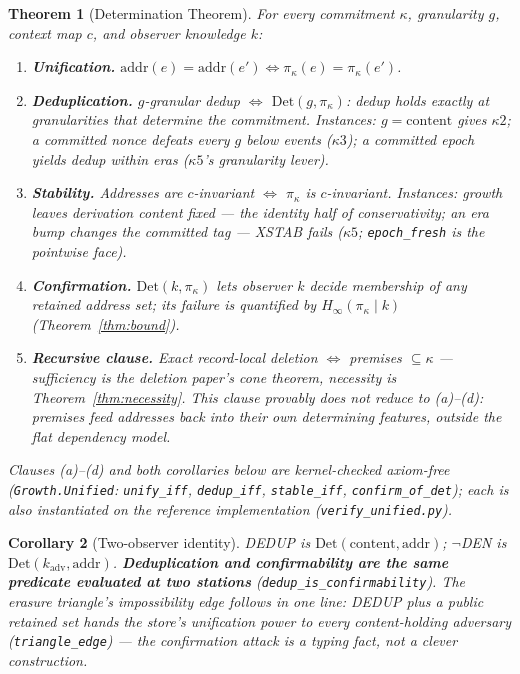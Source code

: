 \documentclass[10pt]{article}
\newtheorem{theorem}{Theorem}
\newtheorem{corollary}[theorem]{Corollary}
\newcommand{\sub}{\subseteq}
\begin{document}
\begin{theorem}[Determination Theorem]\label{thm:determination}
For every commitment $\kappa$, granularity $g$, context map $c$, and observer knowledge $k$:
\begin{enumerate}[label=(\alph*), itemsep=1pt, leftmargin=2em]
\item \textbf{Unification.} $\mathrm{addr}(e) = \mathrm{addr}(e') \iff \pi_\kappa(e) = \pi_\kappa(e')$.
\item \textbf{Deduplication.} $g$-granular dedup $\iff$ $\mathrm{Det}(g, \pi_\kappa)$: dedup holds exactly at granularities that determine the commitment. Instances: $g = \text{content}$ gives $\kappa2$; a committed nonce defeats every $g$ below events ($\kappa3$); a committed epoch yields dedup within eras ($\kappa5$'s granularity lever).
\item \textbf{Stability.} Addresses are $c$-invariant $\iff$ $\pi_\kappa$ is $c$-invariant. Instances: growth leaves derivation content fixed --- the identity half of conservativity; an era bump changes the committed tag --- XSTAB fails ($\kappa5$; \texttt{epoch\_fresh} is the pointwise face).
\item \textbf{Confirmation.} $\mathrm{Det}(k, \pi_\kappa)$ lets observer $k$ decide membership of any retained address set; its failure is quantified by $H_\infty(\pi_\kappa \mid k)$ (Theorem~\ref{thm:bound}).
\item \textbf{Recursive clause.} Exact record-local deletion $\iff$ premises $\sub \kappa$ --- sufficiency is the deletion paper's cone theorem, necessity is Theorem~\ref{thm:necessity}. This clause provably does \emph{not} reduce to (a)--(d): premises feed addresses back into their own determining features, outside the flat dependency model.
\end{enumerate}
Clauses (a)--(d) and both corollaries below are kernel-checked \emph{axiom-free} (\texttt{Growth.Unified}: \texttt{unify\_iff}, \texttt{dedup\_iff}, \texttt{stable\_iff}, \texttt{confirm\_of\_det}); each is also instantiated on the reference implementation (\texttt{verify\_unified.py}).
\end{theorem}

\begin{corollary}[Two-observer identity]\label{cor:twoobs}
DEDUP is $\mathrm{Det}(\text{content}, \mathrm{addr})$; $\neg$DEN is $\mathrm{Det}(k_{\mathrm{adv}}, \mathrm{addr})$. \textbf{Deduplication and confirmability are the same predicate evaluated at two stations} (\texttt{dedup\_is\_confirmability}). The erasure triangle's impossibility edge follows in one line: DEDUP plus a public retained set hands the store's unification power to every content-holding adversary (\texttt{triangle\_edge}) --- the confirmation attack is a typing fact, not a clever construction.
\end{corollary}
\end{document}
